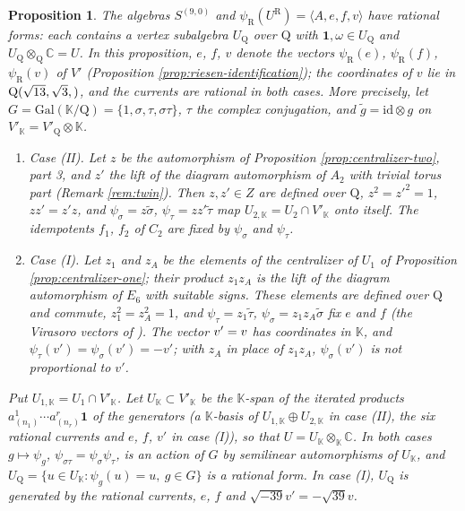 \documentclass[leqno]{article}
\newcommand{\Cbb}{\ensuremath{\mathbb{C}}}
\newcommand{\K}{\ensuremath{\mathbb{K}}}
\newcommand{\Q}{\mathrm{Q}}
\newcommand{\la}{\langle}
\newcommand{\ra}{\rangle}
\newcommand{\ot}{\otimes}
\let\i\relax
\newcommand{\i}{\mathrm{i}}
\newtheorem{prop}[thm]{Proposition}
\numberwithin{equation}{section}
\begin{document}
\begin{prop}
\label{prop:rational-forms}
The algebras $S^{(9,0)}$ and $\psi_{\mathrm R}(U^{\mathrm R}) = \la A,e,f,v\ra$ have rational forms: each contains a vertex subalgebra $U_\Q$ over $\Q$ with $\mathbf 1, \omega \in U_\Q$ and $U_\Q \ot_\Q \Cbb = U$. In this proposition, $e$, $f$, $v$ denote the vectors $\psi_{\mathrm R}(e)$, $\psi_{\mathrm R}(f)$, $\psi_{\mathrm R}(v)$ of $V'$ (Proposition \ref{prop:riesen-identification}); the coordinates of $v$ lie in $\Q(\sqrt{13},\sqrt 3,\i)$, and the currents are rational in both cases. More precisely, let $G = \mathrm{Gal}(\K/\Q) = \{1,\sigma,\tau,\sigma\tau\}$, $\tau$ the complex conjugation, and $\tilde g = \mathrm{id} \ot g$ on $V'_\K = V'_\Q \ot \K$.
\begin{enumerate}
\item Case (II). Let $z$ be the automorphism of Proposition \ref{prop:centralizer-two}, part 3, and $z'$ the lift of the diagram automorphism of $A_2$ with trivial torus part (Remark \ref{rem:twin}). Then $z, z' \in Z$ are defined over $\Q$, $z^2 = z'^2 = 1$, $zz' = z'z$, and $\psi_\sigma = z\tilde\sigma$, $\psi_\tau = zz'\tilde\tau$ map $U_{2,\K} = U_2 \cap V'_\K$ onto itself. The idempotents $f_1$, $f_2$ of $C_2$ are fixed by $\psi_\sigma$ and $\psi_\tau$.
\item Case (I). Let $z_1$ and $z_A$ be the elements of the centralizer of $U_1$ of Proposition \ref{prop:centralizer-one}; their product $z_1z_A$ is the lift of the diagram automorphism of $E_6$ with suitable signs. These elements are defined over $\Q$ and commute, $z_1^2 = z_A^2 = 1$, and $\psi_\tau = z_1\tilde\tau$, $\psi_\sigma = z_1z_A\tilde\sigma$ fix $e$ and $f$ (the Virasoro vectors of \cite{Rie26}). The vector $v' = \i v$ has coordinates in $\K$, and $\psi_\tau(v') = \psi_\sigma(v') = -v'$; with $z_A$ in place of $z_1z_A$, $\psi_\sigma(v')$ is not proportional to $v'$.
\end{enumerate}
Put $U_{1,\K} = U_1 \cap V'_\K$. Let $U_\K \subset V'_\K$ be the $\K$-span of the iterated products $a^1_{(n_1)}\cdots a^r_{(n_r)}\mathbf 1$ of the generators (a $\K$-basis of $U_{1,\K} \oplus U_{2,\K}$ in case (II), the six rational currents and $e$, $f$, $v'$ in case (I)), so that $U = U_\K \ot_\K \Cbb$. In both cases $g \mapsto \psi_g$, $\psi_{\sigma\tau} = \psi_\sigma\psi_\tau$, is an action of $G$ by semilinear automorphisms of $U_\K$, and $U_\Q = \{u \in U_\K : \psi_g(u) = u,\ g \in G\}$ is a rational form. In case (I), $U_\Q$ is generated by the rational currents, $e$, $f$ and $\sqrt{-39} v' = -\sqrt{39} v$.
\end{prop}
\end{document}
